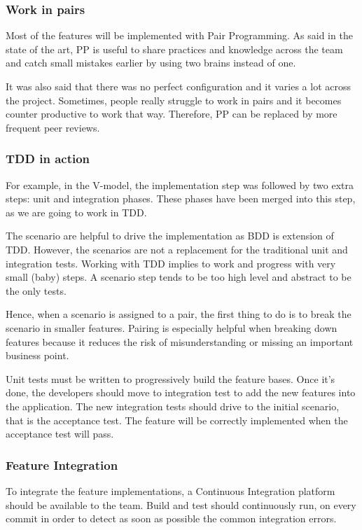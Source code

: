 \subsubsection{Work in pairs}
Most of the features will be implemented with Pair Programming.
As said in the state of the art, PP is useful to share practices and
knowledge across the team and catch small mistakes earlier by using two
brains instead of one.

It was also said that there was no perfect configuration and it varies a lot
across the project.
Sometimes, people really struggle to work in pairs and it becomes counter
productive to work that way.
Therefore, PP can be replaced by more frequent peer reviews.

\subsubsection{TDD in action}
For example, in the V-model, the implementation step was followed by two extra
steps: unit and integration phases.
These phases have been merged into this step, as we are going to work
in TDD\@.

The scenario are helpful to drive the implementation as BDD is extension of
TDD\@.
However, the scenarios are not a replacement for the traditional unit and
integration tests.
Working with TDD implies to work and progress with very small (baby) steps.
A scenario step tends to be too high level and abstract to be the only tests.

Hence, when a scenario is assigned to a pair, the first thing to do is to
break the scenario in smaller features.
Pairing is especially helpful when breaking down features because it reduces
the risk of misunderstanding or missing an important business point.

Unit tests must be written to progressively build the feature bases.
Once it's done, the developers should move to integration test to add the new
features into the application.
The new integration tests should drive to the initial scenario, that is the
acceptance test.
The feature will be correctly implemented when the acceptance test will
pass.

\subsubsection{Feature Integration}
To integrate the feature implementations, a Continuous Integration platform
should be available to the team.
Build and test should continuously run, on every commit in order to detect as
soon as possible the common integration errors.

